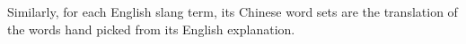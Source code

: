 \noindent
Similarly, for each English slang term, its  Chinese word sets are the translation of the words hand picked
from its English explanation.




%

